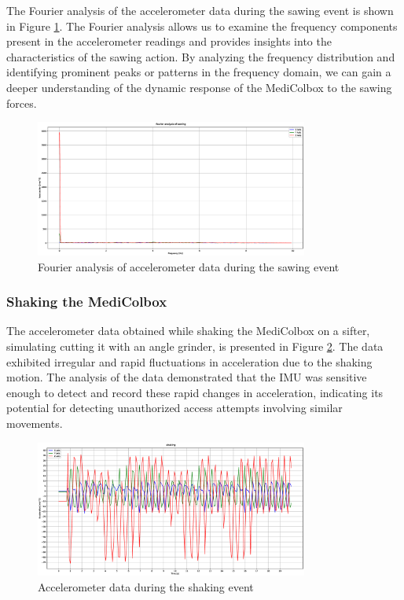 \documentclass[../main.tex]{subfiles}
\begin{document}
The Fourier analysis of the accelerometer data during the sawing event is shown in Figure \ref{fig:fourier_accelerometer_sawing}. The Fourier analysis allows us to examine the frequency components present in the accelerometer readings and provides insights into the characteristics of the sawing action. By analyzing the frequency distribution and identifying prominent peaks or patterns in the frequency domain, we can gain a deeper understanding of the dynamic response of the MediColbox to the sawing forces.

\begin{figure}[htbp]
    \centering
    \includegraphics[width=0.8\textwidth]{resources/figures/Fourier_acceleration_sawing.eps}
    \caption{Fourier analysis of accelerometer data during the sawing event}
    \label{fig:fourier_accelerometer_sawing}
\end{figure}

\clearpage

\subsubsection{Shaking the MediColbox}

The accelerometer data obtained while shaking the
MediColbox on a sifter,
simulating cutting it with an angle grinder,
is presented in Figure \ref{fig:accelerometer_shaking}.
The data exhibited irregular and rapid fluctuations in
acceleration due to the shaking motion.
The analysis of the data demonstrated that the IMU was
sensitive enough to detect and record these rapid changes in
acceleration, indicating its potential for
detecting unauthorized access attempts involving
similar movements.

\begin{figure}[htbp]
    \centering
    \includegraphics[width=0.8\textwidth]{resources/figures/Acceleration_shaking.eps}
    \caption{Accelerometer data during the shaking event}
    \label{fig:accelerometer_shaking}
\end{figure}
\end{document}
